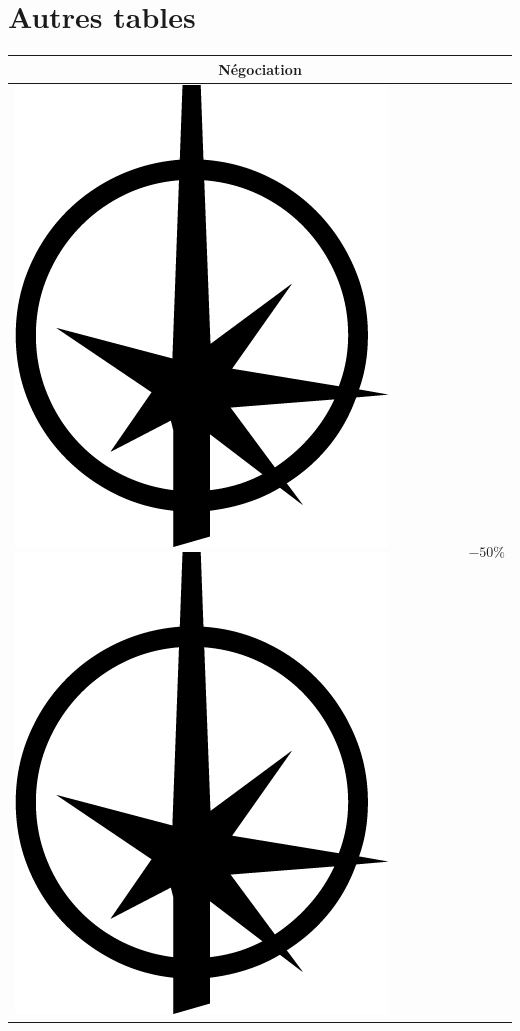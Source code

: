 \documentclass{article}
\begin{document}
\section*{Autres tables}
\begin{multicols}{2}
	\begin{tabular}[b]{|p{5cm}|p{1cm}|}
		\hline 
		\multicolumn{2}{|c|}{\cellcolor{DarkRed} \textbf{{\large \textcolor{PureWhite}{Négociation}}}} \\ 
		\hline 
		{\Large \includegraphics[height=\fontcharht\font`\B]{../img/result_triomphe_triumph} \includegraphics[height=\fontcharht\font`\B]{../img/result_triomphe_triumph}} & $-50\%$ \\ 

\end{tabular}
\end{multicols}
\end{document}
